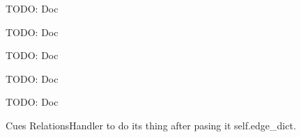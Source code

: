 \documentclass[letterpaper,10pt,english]{sphinxmanual}
\begin{document}
\begin{fulllineitems}
\label{code:gfunc.graphTools.GraphHandler}
TODO: Doc

\begin{fulllineitems}
\label{code:gfunc.graphTools.GraphHandler.__init__}
TODO: Doc

\end{fulllineitems}


\begin{fulllineitems}
\label{code:gfunc.graphTools.GraphHandler.clone_node_as_target}
TODO: Doc

\end{fulllineitems}


\begin{fulllineitems}
\label{code:gfunc.graphTools.GraphHandler.install_metric_handlers}
TODO: Doc

\end{fulllineitems}


\begin{fulllineitems}
\label{code:gfunc.graphTools.GraphHandler.install_target}
TODO: Doc

\end{fulllineitems}


\begin{fulllineitems}
\label{code:gfunc.graphTools.GraphHandler.measure_relations}
Cues RelationsHandler to do its thing after pasing it self.edge\_dict.


\end{fulllineitems}
\end{fulllineitems}
\end{document}
